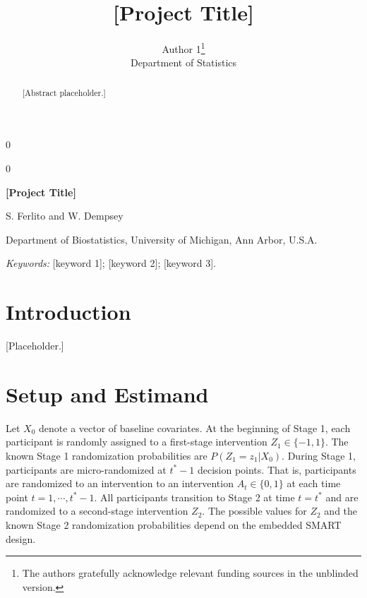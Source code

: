 \documentclass[12pt]{article}
\newcommand{\blind}{0}
\def\spacingset#1{\renewcommand{\baselinestretch}{#1}\small\normalsize}
\begin{document}
\blind
{
  \title{\bf [Project Title]}
  \author{Author 1\thanks{The authors gratefully acknowledge relevant funding sources in the unblinded version.}\\
    Department of Statistics}
  \maketitle
} \fi

\blind
{
  \bigskip
  \bigskip
  \bigskip
  \begin{center}
    {\LARGE\bf [Project Title]}

    \medskip
    S. Ferlito and W. Dempsey

    Department of Biostatistics, University of Michigan, Ann Arbor, U.S.A.
  \end{center}
  \medskip
} \fi

\begin{abstract}
[Abstract placeholder.]
\end{abstract}

\noindent%
{\it Keywords:} [keyword 1]; [keyword 2]; [keyword 3].
\vfill

\newpage
\spacingset{1.45} %

\section{Introduction}
\label{sec:intro}
[Placeholder.]

\section{Setup and Estimand}
\label{sec:setup}
Let $X_0$ denote a vector of baseline covariates. At the beginning of Stage 1, each participant is randomly assigned to a first-stage intervention $Z_1 \in \{-1, 1\}$. The known Stage 1 randomization probabilities are $P(Z_1 = z_1 | X_0)$. During Stage 1, participants are micro-randomized at $t^* -1$ decision points. That is, participants are randomized to an intervention to an intervention $A_t \in \{0,1\}$ at each time point $t = 1, \cdots, t^* - 1$. All participants transition to Stage 2 at time $t = t^*$ and are randomized to a second-stage intervention $Z_2$. The possible values for $Z_2$ and the known Stage 2 randomization probabilities depend on the embedded SMART design. 
\end{document}
